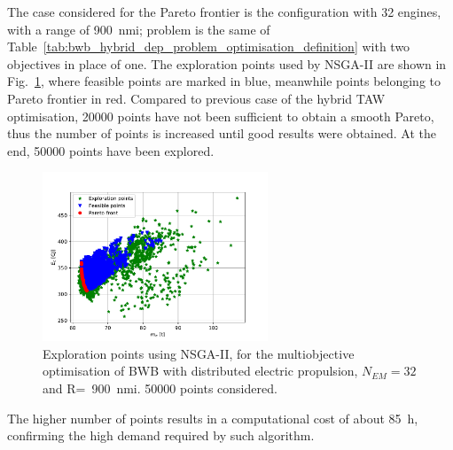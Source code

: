 The case considered for the Pareto frontier is the configuration with 32 engines, with a range of 900~nmi; problem is the same of Table~\ref{tab:bwb_hybrid_dep_problem_optimisation_definition} with two objectives in place of one. 
The exploration points used by NSGA-II are shown in Fig.~\ref{fig:bwb_hybrid_dep_pareto_exploration}, where feasible points are marked in blue, meanwhile points belonging to Pareto frontier in red. 
Compared to previous case of the hybrid TAW optimisation, 20000 points have not been sufficient to obtain a smooth Pareto, thus the number of points is increased until good results were obtained. 
At the end, 50000 points have been explored.
\begin{figure}[!h]
	\centering
	\includegraphics[keepaspectratio, width=0.6\textwidth]{images/chap4/bwb_exp_pt}
	\caption{Exploration points using NSGA-II, for the multiobjective optimisation of BWB with distributed electric propulsion, $N_{EM}=32$ and R=~900~nmi. 50000 points considered.}
	\label{fig:bwb_hybrid_dep_pareto_exploration}
\end{figure}
The higher number of points results in a computational cost of about 85~\si{\hour}, confirming the high demand required by such algorithm. 

